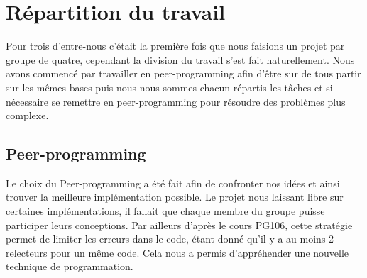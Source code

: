 \section{Répartition du travail}

Pour trois d'entre-nous c'était la première fois que nous faisions un projet par groupe de quatre, cependant la division du travail s'est fait naturellement. Nous avons commencé par travailler en peer-programming afin d'être sur de tous partir sur les mêmes bases puis nous nous sommes chacun répartis les tâches et si nécessaire se remettre en peer-programming pour résoudre des problèmes plus complexe.

\subsection{Peer-programming}
Le choix du Peer-programming a été fait afin de confronter nos idées et ainsi trouver la meilleure implémentation possible. Le projet nous laissant libre sur certaines implémentations, il fallait que chaque membre du groupe puisse participer leurs conceptions. Par ailleurs d'après le cours PG106, cette stratégie permet de limiter les erreurs dans le code, étant donné qu'il y a au moins 2 relecteurs pour un même code. Cela nous a permis d'appréhender une nouvelle technique de programmation.

